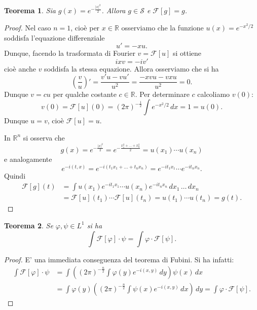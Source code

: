 \documentclass[italian,a4paper,oneside,headinclude]{scrbook}
\renewcommand{\phi}{\varphi}
\newcommand{\F}{\mathcal F}
\renewcommand{\S}{\mathcal S}
\newcommand{\RR}{\mathbb R}
\newcommand{\abs}[1]{{\left|#1\right|}}
\newtheorem{theorem}{Teorema}
\begin{document}
\begin{theorem}\label{th:gaussiana}
  Sia $g(x) = e^{-\frac{\abs{x}^2}{2}}$.
  Allora $g\in\S$ e $\F[g] = g$.
\end{theorem}
%
\begin{proof}
  Nel caso $n=1$, cioè per $x\in \RR$ osserviamo che la funzione
  $u(x) = e^{-x^2/2}$
  soddisfa l'equazione differenziale
  \[
  u' = - x u.
  \]
  Dunque, facendo la trasformata di Fourier $v=\F[u]$ si ottiene
  \[
  i x v = - i v'
  \]
  cioè anche $v$ soddisfa la stessa equazione. Allora osserviamo che si
  ha
  \[
  \left(\frac{v}{u}\right)' = \frac{v' u - v u'}{u^2} = \frac{-x v u -
    v x u}{u^2} = 0.
  \]
  Dunque $v=cu$ per qualche costante $c\in \RR$. Per determinare $c$
  calcoliamo $v(0)$:
  \[
  v(0) = \F[u](0) = (2\pi)^{-\frac 1 2}\int e^{-x^2/2}\, dx  = 1 = u(0).
  \]
  Dunque $u=v$, cioè $\F[u]=u$.

  In $\RR^n$ si osserva che
  \[
  g(x) = e^{-\frac{\abs{x}^2}{2}} = e^{-\frac{x_1^2 + \dots +
      x_n^2}{2}} = u(x_1) \cdots u(x_n)
  \]
  e analogamente
  \[
  e^{-i(t,x)} = e^{-i(t_1x_1+\dots+t_nx_n)} = e^{-it_1x_1}\cdots e^{-it_nx_n}.
  \]
  Quindi
  \begin{align*}
    \F[g](t)
    &= \int u(x_1)e^{-it_1x_1} \cdots u(x_n) e^{-it_nx_n}\, dx_1\, \dots\, dx_n\\
    &= \F[u](t_1) \cdots \F[u](t_n) = u(t_1)\cdots u(t_n) = g(t).
  \end{align*}
\end{proof}

\begin{theorem}
  Se $\phi,\psi \in L^1$ si ha
  \[
   \int \F[\phi] \cdot \psi = \int \phi \cdot \F[\psi].
  \]
\end{theorem}
%
\begin{proof}
  E' una immediata conseguenza del teorema di Fubini. Si ha infatti:
  \begin{align*}
  \int \F[\phi] \cdot \psi
  &= \int \left((2\pi)^{-\frac n 2}\int \phi(y) e^{-i(x,y)}\, dy\right)\psi(x)\, dx\\
  &= \int \phi(y) \left((2\pi)^{-\frac n 2}\int \psi(x) e^{-i(x,y)}\, dx\right) \, dy
  = \int \phi \cdot \F[\psi].
  \end{align*}
\end{proof}
\end{document}
